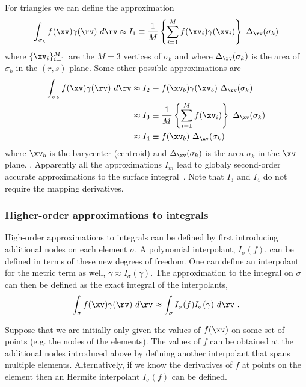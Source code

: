 For triangles we can define the approximation
\begin{align}
\int_{\sigma_k} f(\xv) \gamma(\rv) ~d\rv 
         \approx I_1 \equiv {1\over M}\left\{\sum_{i=1}^M f(\xv_i) \gamma(\xv_i)\right\} ~\Delta_\rv(\sigma_k)
\end{align}
where $\{ \xv_i \}_{i=1}^M$ are the $M=3$ vertices of $\sigma_k$ and 
where $\Delta_\rv(\sigma_k)$ is the area of $\sigma_k$ in the $(r,s)$ plane. 
Some other possible approximations are
\begin{align}
\int_{\sigma_k} f(\xv) \gamma(\rv) ~d\rv 
        & \approx I_2 \equiv f(\xv_b) \gamma(\xv_b)~\Delta_\rv(\sigma_k)  \\
        &  \approx I_3 \equiv {1\over M}\left\{ \sum_{i=1}^M f(\xv_i) \right\} ~\Delta_\xv(\sigma_k) \\
        &  \approx I_4 \equiv f(\xv_b)~\Delta_\xv(\sigma_k)
\end{align}
where $\xv_b$ is the barycenter (centroid) and $\Delta_\xv(\sigma_k)$ is the area $\sigma_k$ in the $\xv$ plane. .
Apparently all the approximations $I_m$ lead to globaly second-order accurate approximations
to the surface integral~\cite{GeorgTausch93}. Note that $I_3$ and $I_4$ do not require the mapping derivatives. 


\subsubsection{Higher-order approximations to integrals}

  High-order approximations to integrals can be defined by first introducing additional nodes
on each element $\sigma$. A polynomial interpolant, $I_{\sigma}(f)$, can be defined in terms of these new
degrees of freedom. One can define an interpolant for the metric term as well, $\gamma\approx I_{\sigma}(\gamma)$. The
approximation to the integral on $\sigma$ can then be defined as the exact integral of the
interpolants,
\begin{align}
  \int_{\sigma} f(\xv) \gamma(\rv) ~d\rv  \approx \int_{\sigma} I_{\sigma}(f) I_{\sigma}(\gamma) ~d\rv~.
\end{align}

Suppose that we are initially only given the values of $f(\xv)$ on some set of
points (e.g. the nodes of the elements).  The values of $f$ can be obtained at the additional 
nodes introduced above by defining another interpolant that spans multiple elements. Alternatively, if we know the
derivatives of $f$ at points on the element then an Hermite interpolant $I_{\sigma}(f)$ can be defined.



